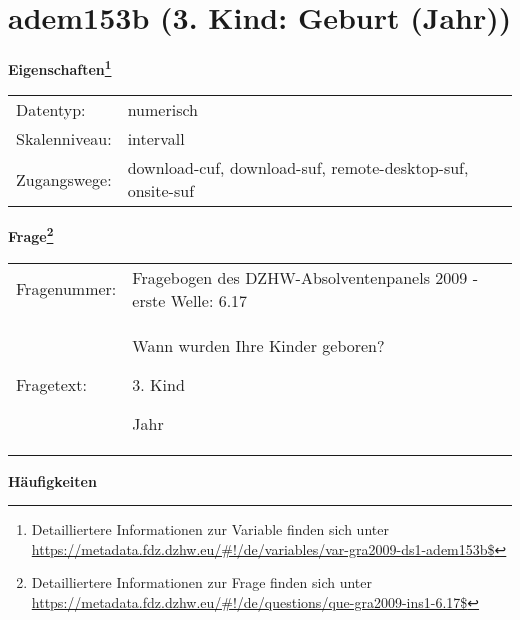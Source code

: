
    \setcounter{footnote}{0}

    \vspace*{-1.8cm}
	\section{adem153b (3. Kind: Geburt (Jahr))}
	\label{section:adem153b}



    \vspace*{0.5cm}
    \noindent\textbf{Eigenschaften\footnote{Detailliertere Informationen zur Variable finden sich unter
		\url{https://metadata.fdz.dzhw.eu/\#!/de/variables/var-gra2009-ds1-adem153b$}}}\\
	\begin{tabularx}{\hsize}{@{}lX}
	Datentyp: & numerisch \\
	Skalenniveau: & intervall \\
	Zugangswege: &
	  download-cuf, 
	  download-suf, 
	  remote-desktop-suf, 
	  onsite-suf
 \\
    \end{tabularx}



				\vspace*{0.5cm}
                \noindent\textbf{Frage\footnote{Detailliertere Informationen zur Frage finden sich unter
		              \url{https://metadata.fdz.dzhw.eu/\#!/de/questions/que-gra2009-ins1-6.17$}}}\\
				\begin{tabularx}{\hsize}{@{}lX}
					Fragenummer: &
					  Fragebogen des DZHW-Absolventenpanels 2009 - erste Welle:
					  6.17
 \\
					Fragetext: & Wann wurden Ihre Kinder geboren?\par  3. Kind\par  Jahr \\
				\end{tabularx}





        		\vspace*{0.5cm}
                \noindent\textbf{Häufigkeiten}

